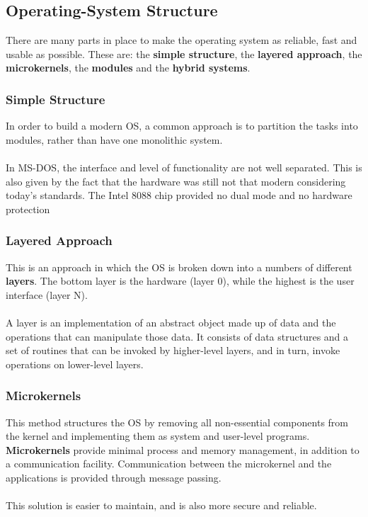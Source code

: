 \documentclass{article}
\begin{document}
\subsection{Operating-System Structure}
There are many parts in place to make the operating system as reliable, fast and usable as possible. These are: the \textbf{simple structure}, the \textbf{layered approach}, the \textbf{microkernels}, the \textbf{modules} and the \textbf{hybrid systems}.

\subsubsection{Simple Structure}
In order to build a modern OS, a common approach is to partition the tasks into modules, rather than have one monolithic system. \\ \\
In MS-DOS, the interface and level of functionality are not well separated. This is also given by the fact that the hardware was still not that modern considering today's standards. The Intel 8088 chip provided no dual mode and no hardware protection

\subsubsection{Layered Approach}
This is an approach in which the OS is broken down into a numbers of different \textbf{layers}. The bottom layer is the hardware (layer 0), while the highest is the user interface (layer N). \\ \\
A layer is an implementation of an abstract object made up of data and the operations that can manipulate those data. It consists of data structures and a set of routines that can be invoked by higher-level layers, and in turn, invoke operations on lower-level layers.

\subsubsection{Microkernels}
This method structures the OS by removing all non-essential components from the kernel and implementing them as system and user-level programs. \textbf{Microkernels} provide minimal process and memory management, in addition to a communication facility. Communication between the microkernel and the applications is provided through message passing. \\ \\
This solution is easier to maintain, and is also more secure and reliable.
\end{document}
